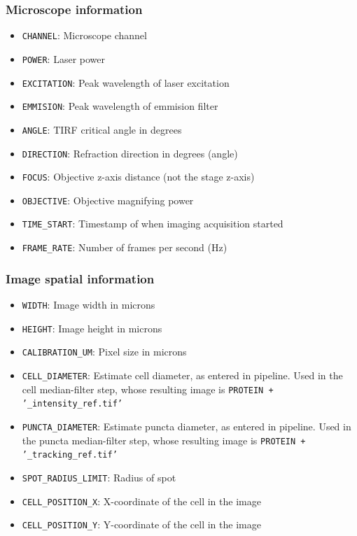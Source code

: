 \subsubsection{Microscope information}
\begin{itemize}
    \item \texttt{CHANNEL}: Microscope channel
    \item \texttt{POWER}: Laser power
    \item \texttt{EXCITATION}: Peak wavelength of laser excitation
    \item \texttt{EMMISION}: Peak wavelength of emmision filter
    \item \texttt{ANGLE}: TIRF critical angle in degrees
    \item \texttt{DIRECTION}: Refraction direction in degrees (angle)
    \item \texttt{FOCUS}: Objective z-axis distance (not the stage z-axis)
    \item \texttt{OBJECTIVE}: Objective magnifying power
    \item \texttt{TIME\_START}: Timestamp of when imaging acquisition started
    \item \texttt{FRAME\_RATE}: Number of frames per second (Hz)
\end{itemize}

\subsubsection{Image spatial information}
\begin{itemize}
    \item \texttt{WIDTH}: Image width in microns
    \item \texttt{HEIGHT}: Image height in microns
    \item \texttt{CALIBRATION\_UM}: Pixel size in microns
    \item \texttt{CELL\_DIAMETER}: Estimate cell diameter, as entered in pipeline. Used in the cell median-filter step, whose resulting image is \texttt{PROTEIN + '\_intensity\_ref.tif'}
    \item \texttt{PUNCTA\_DIAMETER}: Estimate puncta diameter, as entered in pipeline. Used in the puncta median-filter step, whose resulting image is \texttt{PROTEIN + '\_tracking\_ref.tif'}
    \item \texttt{SPOT\_RADIUS\_LIMIT}: Radius of spot
    \item \texttt{CELL\_POSITION\_X}: X-coordinate of the cell in the image
    \item \texttt{CELL\_POSITION\_Y}: Y-coordinate of the cell in the image
\end{itemize}

